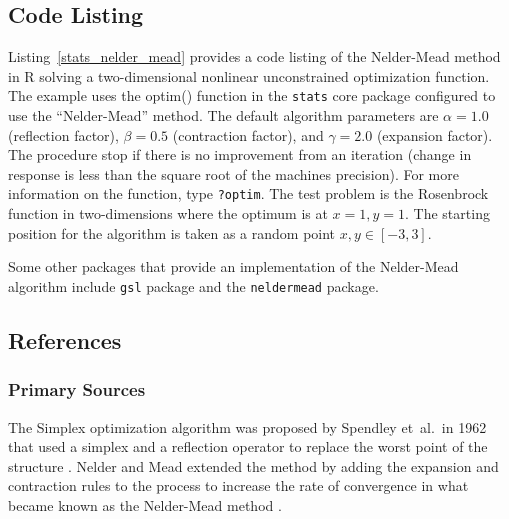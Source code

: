 \subsection{Code Listing}
Listing~\ref{stats_nelder_mead} provides a code listing of the Nelder-Mead method in R solving a two-dimensional nonlinear unconstrained optimization function.
The example uses the {optim()} function in the \texttt{stats} core package configured to use the ``Nelder-Mead'' method. The default algorithm parameters are $\alpha=1.0$ (reflection factor), $\beta=0.5$ (contraction factor), and $\gamma=2.0$ (expansion factor). The procedure stop if there is no improvement from an iteration (change in response is less than the square root of the machines precision). For more information on the function, type \texttt{?optim}.
The test problem is the Rosenbrock function in two-dimensions where the optimum is at $x=1, y=1$. The starting position for the algorithm is taken as a random point $x,y \in [-3,3]$.



Some other packages that provide an implementation of the Nelder-Mead algorithm include \texttt{gsl} package and the \texttt{neldermead} package.

\subsection{References}

\subsubsection{Primary Sources}
The Simplex optimization algorithm was proposed by Spendley et~al.\ in 1962 that used a simplex and a reflection operator to replace the worst point of the structure \cite{Spendley1962}.
Nelder and Mead extended the method by adding the expansion and contraction rules to the process to increase the rate of convergence in what became known as the Nelder-Mead method \cite{Nelder1965}.

